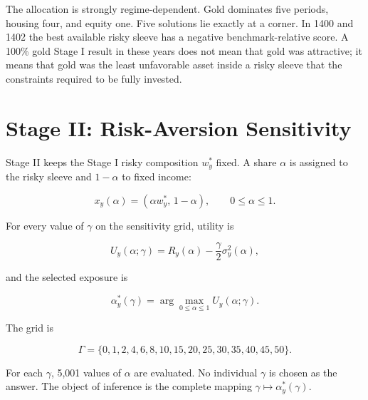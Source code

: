 \documentclass[11pt,a4paper]{article}
\begin{document}
The allocation is strongly regime-dependent. Gold dominates five periods, housing four, and
equity one. Five solutions lie exactly at a corner. In 1400 and 1402 the best available risky
sleeve has a negative benchmark-relative score. A 100\% gold Stage I result in these years does
not mean that gold was attractive; it means that gold was the least unfavorable asset inside a
risky sleeve that the constraints required to be fully invested.

\section{Stage II: Risk-Aversion Sensitivity}

Stage II keeps the Stage I risky composition $w_y^*$ fixed. A share $\alpha$ is assigned to the
risky sleeve and $1-\alpha$ to fixed income:

\begin{equation}
x_y(\alpha)=\left(\alpha w_y^*,\,1-\alpha\right),
\qquad 0\le\alpha\le1.
\end{equation}

For every value of $\gamma$ on the sensitivity grid, utility is

\begin{equation}
U_y(\alpha;\gamma)
=R_y(\alpha)-\frac{\gamma}{2}\sigma_y^2(\alpha),
\end{equation}

and the selected exposure is

\begin{equation}
\alpha_y^*(\gamma)=
\arg\max_{0\le\alpha\le1}U_y(\alpha;\gamma).
\end{equation}

The grid is

\begin{equation}
\Gamma=\{0,1,2,4,6,8,10,15,20,25,30,35,40,45,50\}.
\end{equation}

For each $\gamma$, 5,001 values of $\alpha$ are evaluated. No individual $\gamma$ is chosen as
the answer. The object of inference is the complete mapping
$\gamma\mapsto\alpha_y^*(\gamma)$.
\end{document}
